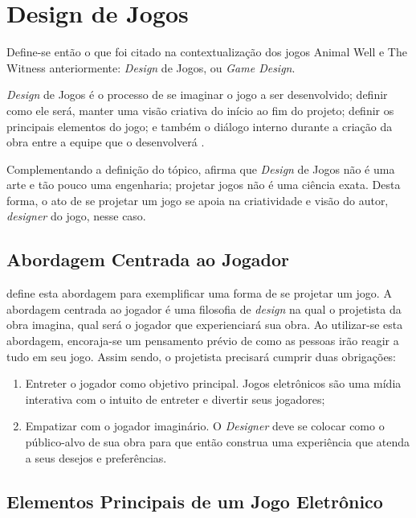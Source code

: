 \section{Design de Jogos}

Define-se então o que foi citado na contextualização dos jogos Animal Well e The Witness anteriormente: \textit{Design} de Jogos, ou \textit{Game Design}.

\textit{Design} de Jogos é o processo de se imaginar o jogo a ser desenvolvido; definir como ele será, manter uma visão criativa do início ao fim do projeto; definir os principais elementos do jogo; e também o diálogo interno durante a criação da obra entre a equipe que o desenvolverá \cite{Adams2010}.

Complementando a definição do tópico,  afirma que \textit{Design} de Jogos não é uma arte e tão pouco uma engenharia; projetar jogos não é uma ciência exata. Desta forma, o ato de se projetar um jogo se apoia na criatividade e visão do autor, \textit{designer} do jogo, nesse caso.

\subsection{Abordagem Centrada ao Jogador}

 define esta abordagem para exemplificar uma forma de se projetar um jogo. A abordagem centrada ao jogador é uma filosofia de \textit{design} na qual o projetista da obra imagina, qual será o jogador que experienciará sua obra. Ao utilizar-se esta abordagem, encoraja-se um pensamento prévio de como as pessoas irão reagir a tudo em seu jogo. Assim sendo, o projetista precisará cumprir duas obrigações:

\begin{enumerate}
    \item Entreter o jogador como objetivo principal. Jogos eletrônicos são uma mídia interativa com o intuito de entreter e divertir seus jogadores;
    \item Empatizar com o jogador imaginário. O \textit{Designer} deve se colocar como o público-alvo de sua obra para que então construa uma experiência que atenda a seus desejos e preferências.
\end{enumerate}

\subsection{Elementos Principais de um Jogo Eletrônico}

